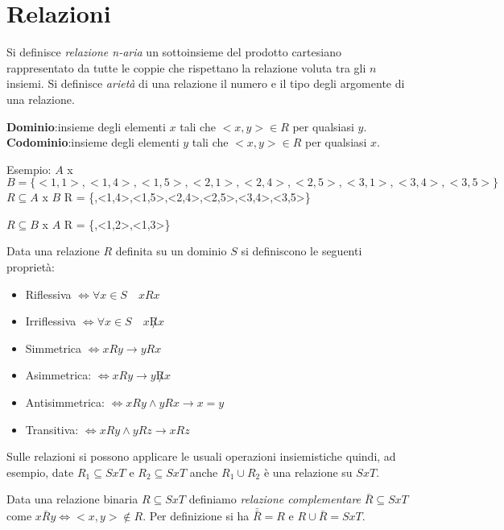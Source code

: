 \chapter{Relazioni}
Si definisce \textit{relazione n-aria} un sottoinsieme del prodotto cartesiano
rappresentato da tutte le coppie che rispettano la relazione voluta tra gli $n$ insiemi.
Si definisce \textit{arietà} di una relazione il numero e il tipo degli argomente
di una relazione.

\textbf{Dominio}:insieme degli elementi $x$ tali che $<x,y> \in R$ per qualsiasi $y$.
\textbf{Codominio}:insieme degli elementi $y$ tali che $<x,y> \in R$ per qualsiasi $x$.

Esempio:\newline
$A$ x $B = \{<1,1>,<1,4>,<1,5>,<2,1>,<2,4>,<2,5>,<3,1>,<3,4>,<3,5>\} $ \newline
$R \subseteq A$ x $B$\newline
R = \{<1,1>,<1,4>,<1,5>,<2,4>,<2,5>,<3,4>,<3,5>\}

$R \subseteq B$ x $A$ \newline
R = \{<1,1>,<1,2>,<1,3>\}

Data una relazione $R$ definita su un dominio $S$ si definiscono le seguenti proprietà:

\begin{itemize}
  \item Riflessiva $\iff \forall x \in S \quad xRx$
  \item Irriflessiva $\iff \forall x \in S \quad x \not R x$
  \item Simmetrica $\iff  xRy \rightarrow yRx$
  \item Asimmetrica: $\iff xRy \rightarrow y \not R x$
  \item Antisimmetrica: $\iff xRy \land yRx \rightarrow x = y$
  \item Transitiva: $\iff xRy \land yRz \rightarrow xRz$
\end{itemize}


Sulle relazioni si possono applicare le usuali operazioni insiemistiche quindi, ad esempio,
date $R_1 \subseteq S x T$ e $R_2 \subseteq S x T$ anche $R_1 \cup R_2$ è una relazione su $S x T$.

Data una relazione binaria $R \subseteq S x T$ definiamo \emph{relazione complementare}
$\bar{R} \subseteq S x T$ come $x \bar{R}y \iff <x,y> \not \in R$.
Per definizione si ha $\bar{\bar{R}} = R$ e $R \cup \bar{R} = S x T$.

